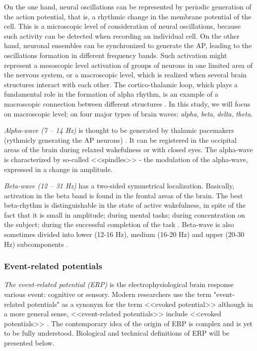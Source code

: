 \documentclass[14pt,a4paper]{scrartcl}
\begin{document}
On the one hand, neural oscillations can be represented by periodic generation of the action potential, that is, a rhythmic change in the membrane potential of the cell. This is a microscopic level of consideration of neural oscillations, because such activity can be detected when recording an individual cell. On the other hand, neuronal ensembles can be synchronized to generate the AP, leading to the oscillations formation in different frequency bands. Such activation might represent a mesoscopic level activation of groups of neurons in one limited area of the nervous system, or a macroscopic level, which is realized when several brain structures interact with each other. The cortico-thalamic loop, which plays a fundamental role in the formation of alpha rhythm, is an example of a macroscopic connection between different structures \cite{Domino2009,Bollimunta2011}. In this study, we will focus on macroscopic level; on four major types of brain waves: \textit{alpha}, \textit{beta}, \textit{delta}, \textit{theta}.

\textit{Alpha-wave (7 – 14 Hz)} is thought to be generated by thalamic pacemakers (rythmicly generating the AP neurons) \cite{Domino2009}. It can be registered in the occipital areas of the brain during relaxed wakefulness or with closed eyes. The alpha-wave is characterized by so-called <<spindles>> - the modulation of the alpha-wave, expressed in a change in amplitude\cite{Buzsaki2009}.

\textit{Beta-wave (12 – 31 Hz)} has a two-sided symmetrical localization. Basically, activation in the beta band is found in the frontal areas of the brain. The best beta-rhythm is distinguishable in the state of active wakefulness, in spite of the fact that it is small in amplitude; during mental tasks; during concentration on the subject; during the successful completion of the task \cite{Buzsaki2009,Engel2010}. 
Beta-wave is also sometimes divided into lower (12-16 Hz), medium (16-20 Hz) and upper (20-30 Hz) subcomponents \cite{Rangaswamy2003}.

\textit{}

\subsubsection{Event-related potentials}
\label{sec:Hypothesis:Bioelectricity:Event-related potentials}

 \textit{The event-related potential (ERP)} is the electrophysiological brain response various event: cognitive or sensory. Modern researchers use the term "event-related potentials" as a synonym for the term <<evoked potential>> although in a more general sense, <<event-related potentials>> include <<evoked potentials>> \cite{Luck2005}. The contemporary idea of the origin of ERP is complex and is yet to be fully understood. Biological and technical definitions of ERP will be presented below. 
\end{document}
